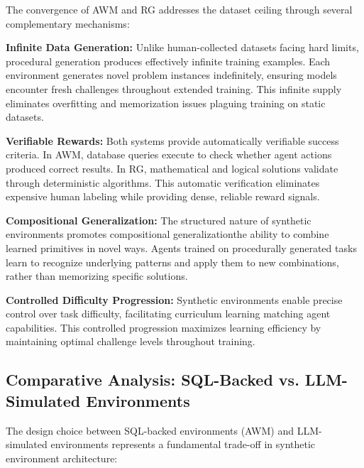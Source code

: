 The convergence of AWM and RG addresses the dataset ceiling through several complementary mechanisms:

\textbf{Infinite Data Generation:} Unlike human-collected datasets facing hard limits, procedural generation produces effectively infinite training examples. Each environment generates novel problem instances indefinitely, ensuring models encounter fresh challenges throughout extended training. This infinite supply eliminates overfitting and memorization issues plaguing training on static datasets.

\textbf{Verifiable Rewards:} Both systems provide automatically verifiable success criteria. In AWM, database queries execute to check whether agent actions produced correct results. In RG, mathematical and logical solutions validate through deterministic algorithms. This automatic verification eliminates expensive human labeling while providing dense, reliable reward signals.

\textbf{Compositional Generalization:} The structured nature of synthetic environments promotes compositional generalizationthe ability to combine learned primitives in novel ways. Agents trained on procedurally generated tasks learn to recognize underlying patterns and apply them to new combinations, rather than memorizing specific solutions.

\textbf{Controlled Difficulty Progression:} Synthetic environments enable precise control over task difficulty, facilitating curriculum learning matching agent capabilities. This controlled progression maximizes learning efficiency by maintaining optimal challenge levels throughout training.

\subsection{Comparative Analysis: SQL-Backed vs. LLM-Simulated Environments}

The design choice between SQL-backed environments (AWM) and LLM-simulated environments represents a fundamental trade-off in synthetic environment architecture:

